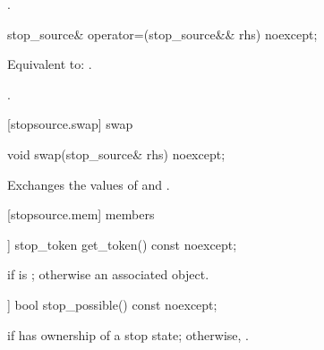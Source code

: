 {\begin{itemdescr}
  \pnum\returns {}.
\end{itemdescr}

%
\begin{itemdecl}
stop_source& operator=(stop_source&& rhs) noexcept;
\end{itemdecl}
\begin{itemdescr}
  \pnum\effects Equivalent to: .

  \pnum\returns {}.
\end{itemdescr}

[stopsource.swap]{ swap}

%
\begin{itemdecl}
void swap(stop_source& rhs) noexcept;
\end{itemdecl}

\begin{itemdescr}
 \pnum \effects Exchanges the values of  and .
\end{itemdescr}


[stopsource.mem]{ members}

%
\begin{itemdecl}
[[nodiscard]] stop_token get_token() const noexcept;
\end{itemdecl}
\begin{itemdescr}
  \pnum\returns {} if  is ;
                otherwise an associated  object.
\end{itemdescr}


%
\begin{itemdecl}
[[nodiscard]] bool stop_possible() const noexcept;
\end{itemdecl}
\begin{itemdescr}
  \pnum\returns {} if  has ownership of a stop state;
                otherwise, .
\end{itemdescr}

}
